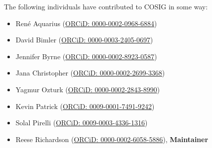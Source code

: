 \documentclass[letterpaper, 12pt]{article}
\begin{document}
\pagebreak

The following individuals have contributed to COSIG in some way:

\begin{itemize}
    \setlength\itemsep{-0.5em}
    \item Ren\'e Aquarius (\href{https://orcid.org/0000-0002-0968-6884}{ORCiD: 0000-0002-0968-6884})
    \item David Bimler (\href{https://orcid.org/0000-0003-2405-0697}{ORCiD: 0000-0003-2405-0697})
    \item Jennifer Byrne (\href{https://orcid.org/0000-0002-8923-0587}{ORCiD: 0000-0002-8923-0587})
    \item Jana Christopher (\href{https://orcid.org/0000-0002-2699-3368}{ORCiD: 0000-0002-2699-3368})
    \item Yagmur Ozturk (\href{https://orcid.org/0000-0002-2843-8990}{ORCiD: 0000-0002-2843-8990})
    \item Kevin Patrick (\href{https://orcid.org/0009-0001-7491-9242}{ORCiD: 0009-0001-7491-9242})
    \item Solal Pirelli (\href{https://orcid.org/0009-0003-4336-1316}{ORCiD: 0009-0003-4336-1316})
    \item Reese Richardson (\href{https://orcid.org/0000-0002-6058-5886}{ORCiD: 0000-0002-6058-5886}), \textbf{Maintainer}
\end{itemize}
\end{document}
